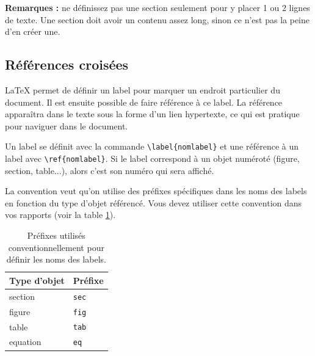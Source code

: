 \documentclass{ceri}
\begin{document}
\textbf{Remarques :} ne définissez pas une section seulement pour y placer 1 ou 2 lignes de texte. Une section doit avoir un contenu assez long, sinon ce n'est pas la peine d'en créer une.
	
\subsection{Références croisées}
\label{sec:references}
\LaTeX{} permet de définir un label pour marquer un endroit particulier du document. Il est ensuite possible de faire référence à ce label. La référence apparaîtra dans le texte sous la forme d'un lien hypertexte, ce qui est pratique pour naviguer dans le document. 
	
Un label se définit avec la commande \texttt{\textbackslash{}label\{nomlabel\}} et une référence à un label avec \texttt{\textbackslash{}ref\{nomlabel\}}. Si le label correspond à un objet numéroté (figure, section, table...), alors c'est son numéro qui sera affiché.
	
La convention veut qu'on utilise des préfixes spécifiques dans les noms des labels en fonction du type d'objet référencé. Vous devez utiliser cette convention dans vos rapports (voir la table \ref{tab:prefixes}).
	
\begin{table}[htb]
	\centering
	\begin{tabular}{l l}
		\hline
		\rowcolor{DarkColor} 
		\textbf{Type d'objet}	& \textbf{Préfixe}	\\
		\hline
		section					& \texttt{sec}	\\
		figure 					& \texttt{fig}	\\
		table 					& \texttt{tab}	\\
		equation 				& \texttt{eq}	\\
		\hline
	\end{tabular}
	\caption{Préfixes utilisés conventionnellement pour définir les noms des labels.}
	\label{tab:prefixes}
\end{table}
	
\end{document}
